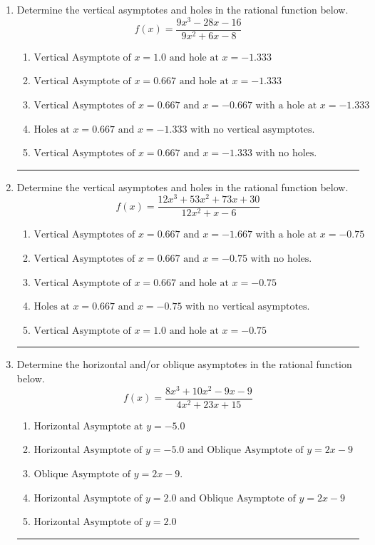 \documentclass[14pt]{extbook}
\newcommand{\litem}[1]{\item#1\hspace*{-1cm}\rule{\textwidth}{0.4pt}}
\begin{document}
\begin{enumerate}
{\begin{enumerate}[label=\Alph*.]
\end{enumerate} }
\litem{
Determine the vertical asymptotes and holes in the rational function below.\[ f(x) = \frac{9x^{3} -28 x -16}{9x^{2} +6 x -8} \]\begin{enumerate}[label=\Alph*.]
\item \( \text{Vertical Asymptote of } x = 1.0 \text{ and hole at } x = -1.333 \)
\item \( \text{Vertical Asymptote of } x = 0.667 \text{ and hole at } x = -1.333 \)
\item \( \text{Vertical Asymptotes of } x = 0.667 \text{ and } x = -0.667 \text{ with a hole at } x = -1.333 \)
\item \( \text{Holes at } x = 0.667 \text{ and } x = -1.333 \text{ with no vertical asymptotes.} \)
\item \( \text{Vertical Asymptotes of } x = 0.667 \text{ and } x = -1.333 \text{ with no holes.} \)

\end{enumerate} }
\litem{
Determine the vertical asymptotes and holes in the rational function below.\[ f(x) = \frac{12x^{3} +53 x^{2} +73 x + 30}{12x^{2} +x -6} \]\begin{enumerate}[label=\Alph*.]
\item \( \text{Vertical Asymptotes of } x = 0.667 \text{ and } x = -1.667 \text{ with a hole at } x = -0.75 \)
\item \( \text{Vertical Asymptotes of } x = 0.667 \text{ and } x = -0.75 \text{ with no holes.} \)
\item \( \text{Vertical Asymptote of } x = 0.667 \text{ and hole at } x = -0.75 \)
\item \( \text{Holes at } x = 0.667 \text{ and } x = -0.75 \text{ with no vertical asymptotes.} \)
\item \( \text{Vertical Asymptote of } x = 1.0 \text{ and hole at } x = -0.75 \)

\end{enumerate} }
\litem{
Determine the horizontal and/or oblique asymptotes in the rational function below.\[ f(x) = \frac{8x^{3} +10 x^{2} -9 x -9}{4x^{2} +23 x + 15} \]\begin{enumerate}[label=\Alph*.]
\item \( \text{Horizontal Asymptote at } y = -5.0 \)
\item \( \text{Horizontal Asymptote of } y = -5.0 \text{ and Oblique Asymptote of } y = 2x -9 \)
\item \( \text{Oblique Asymptote of } y = 2x -9. \)
\item \( \text{Horizontal Asymptote of } y = 2.0 \text{ and Oblique Asymptote of } y = 2x -9 \)
\item \( \text{Horizontal Asymptote of } y = 2.0  \)


\end{enumerate}}
\end{enumerate}
\end{document}
